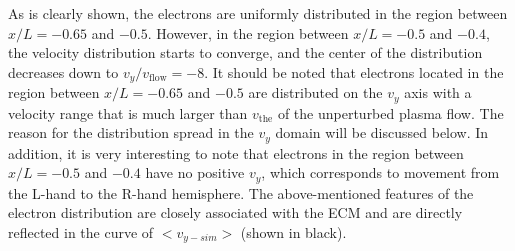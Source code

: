 \documentclass[draft,jgrga]{agutex2015}
\begin{document}
\begin{article}
As is clearly shown, the 
electrons are uniformly distributed 
in the region between $x/L =-0.65$ and $-0.5$.
However, in the region between $x/L =-0.5$ and $-0.4$, 
the velocity distribution starts to converge, 
and the center of the distribution decreases down to 
$v_y/v_{\mathrm{flow}}=-8$. 
It should be noted that 
electrons located in the region between $x/L =-0.65$ and $-0.5$
are distributed on the $v_y$ axis with a velocity range that is much larger 
than $v_{\mathrm{the}}$ of the unperturbed plasma flow. 
The reason for the distribution spread in the $v_{y}$ domain
will be discussed below.
In addition, it is very interesting to note that electrons
in the region between $x/L =-0.5$ and $-0.4$
have no positive $v_y$, which corresponds to movement 
from the L-hand to the R-hand hemisphere.
The above-mentioned features of the electron distribution are closely
associated with the ECM 
and are directly reflected in the curve of $<v_{y-sim}>$ (shown in black).



\end{article}
\end{document}
